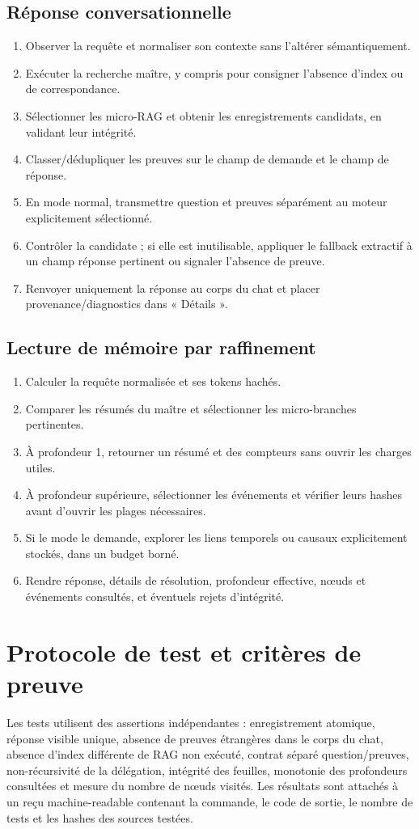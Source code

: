 \documentclass[11pt,a4paper]{article}
\begin{document}
\subsection{Réponse conversationnelle}
\begin{enumerate}
\item Observer la requête et normaliser son contexte sans l'altérer sémantiquement.
\item Exécuter la recherche maître, y compris pour consigner l'absence d'index ou de correspondance.
\item Sélectionner les micro-RAG et obtenir les enregistrements candidats, en validant leur intégrité.
\item Classer/dédupliquer les preuves sur le champ de demande et le champ de réponse.
\item En mode normal, transmettre question et preuves séparément au moteur explicitement sélectionné.
\item Contrôler la candidate ; si elle est inutilisable, appliquer le fallback extractif à un champ réponse pertinent ou signaler l'absence de preuve.
\item Renvoyer uniquement la réponse au corps du chat et placer provenance/diagnostics dans « Détails ».
\end{enumerate}

\subsection{Lecture de mémoire par raffinement}
\begin{enumerate}
\item Calculer la requête normalisée et ses tokens hachés.
\item Comparer les résumés du maître et sélectionner les micro-branches pertinentes.
\item À profondeur 1, retourner un résumé et des compteurs sans ouvrir les charges utiles.
\item À profondeur supérieure, sélectionner les événements et vérifier leurs hashes avant d'ouvrir les plages nécessaires.
\item Si le mode le demande, explorer les liens temporels ou causaux explicitement stockés, dans un budget borné.
\item Rendre réponse, détails de résolution, profondeur effective, nœuds et événements consultés, et éventuels rejets d'intégrité.
\end{enumerate}

\section{Protocole de test et critères de preuve}
Les tests utilisent des assertions indépendantes : enregistrement atomique, réponse visible unique, absence de preuves étrangères dans le corps du chat, absence d'index différente de RAG non exécuté, contrat séparé question/preuves, non-récursivité de la délégation, intégrité des feuilles, monotonie des profondeurs consultées et mesure du nombre de nœuds visités. Les résultats sont attachés à un reçu machine-readable contenant la commande, le code de sortie, le nombre de tests et les hashes des sources testées.
\end{document}
